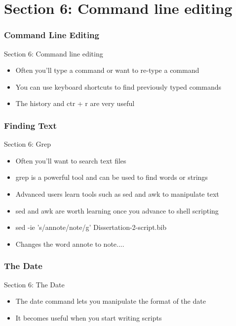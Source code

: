\part{Section 6: Command line editing}
\begin{frame}
\partpage
\end{frame}

\section{Command Line Editing}
\begin{frame}{Section 6: Command line editing}
\begin{itemize}
\item Often you'll type a command or want to re-type a command
\item You can use keyboard shortcuts to find previously typed commands
\item The history and ctr + r are very useful
\end{itemize}
\end{frame}

\section{Finding Text}
\begin{frame}{Section 6: Grep}
\begin{itemize}
\item Often you'll want to search text files
\item grep is a powerful tool and can be used to find words or strings
\item Advanced users learn tools such as sed and awk to manipulate text
\item sed and awk are worth learning once you advance to shell scripting
\item sed -ie 's/annote/note/g' Dissertation-2-script.bib
\item Changes the word annote to note....
\end{itemize}
\end{frame}

\section{The Date}
\begin{frame}{Section 6: The Date}
\begin{itemize}
\item The date command lets you manipulate the format of the date
\item It becomes useful when you start writing scripts
\end{itemize}
\end{frame}

